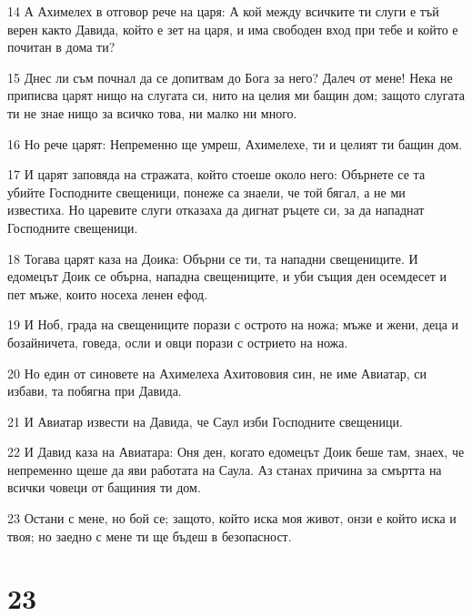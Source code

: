 \par 14 А Ахимелех в отговор рече на царя: А кой между всичките ти слуги е тъй верен както Давида, който е зет на царя, и има свободен вход при тебе и който е почитан в дома ти?
\par 15 Днес ли съм почнал да се допитвам до Бога за него? Далеч от мене! Нека не приписва царят нищо на слугата си, нито на целия ми бащин дом; защото слугата ти не знае нищо за всичко това, ни малко ни много.
\par 16 Но рече царят: Непременно ще умреш, Ахимелехе, ти и целият ти бащин дом.
\par 17 И царят заповяда на стражата, който стоеше около него: Обърнете се та убийте Господните свещеници, понеже са знаели, че той бягал, а не ми известиха. Но царевите слуги отказаха да дигнат ръцете си, за да нападнат Господните свещеници.
\par 18 Тогава царят каза на Доика: Обърни се ти, та нападни свещениците. И едомецът Доик се обърна, нападна свещениците, и уби същия ден осемдесет и пет мъже, които носеха ленен ефод.
\par 19 И Ноб, града на свещениците порази с острото на ножа; мъже и жени, деца и бозайничета, говеда, осли и овци порази с острието на ножа.
\par 20 Но един от синовете на Ахимелеха Ахитововия син, не име Авиатар, си избави, та побягна при Давида.
\par 21 И Авиатар извести на Давида, че Саул изби Господните свещеници.
\par 22 И Давид каза на Авиатара: Оня ден, когато едомецът Доик беше там, знаех, че непременно щеше да яви работата на Саула. Аз станах причина за смъртта на всички човеци от бащиния ти дом.
\par 23 Остани с мене, но бой се; защото, който иска моя живот, онзи е който иска и твоя; но заедно с мене ти ще бъдеш в безопасност.

\chapter{23}

